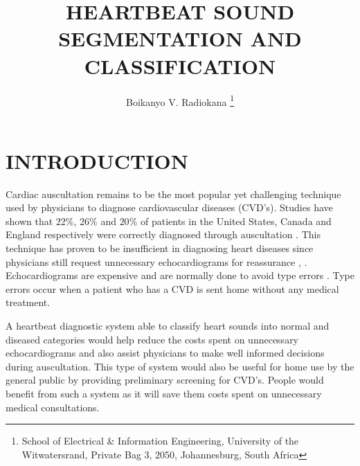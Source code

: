 \documentclass[10pt,twocolumn]{witseiepaper}
\newcommand{\RomanNumeralCaps}[1]
    {\MakeUppercase{\romannumeral #1}}
\begin{document}
\title{\centering HEARTBEAT SOUND SEGMENTATION AND CLASSIFICATION}

\author{Boikanyo V. Radiokana
\thanks{School of Electrical \& Information Engineering, University of the
Witwatersrand, Private Bag 3, 2050, Johannesburg, South Africa}
}


%



\maketitle
\thispagestyle{empty}\pagestyle{empty}


%
\section{INTRODUCTION}
Cardiac auscultation remains to be the most popular yet challenging technique used by physicians to diagnose cardiovascular diseases (CVD's). Studies have shown that $22\%$, $26\%$ and $20\%$ of patients in the United States, Canada and England respectively were correctly diagnosed through auscultation \cite{1}. This technique has proven to be insufficient in diagnosing heart diseases since physicians still request unnecessary echocardiograms for reassurance \cite{strunic2007detection}, \cite{meziani2012analysis}. Echocardiograms are expensive and are normally done to avoid type \RomanNumeralCaps{2} errors \cite{strunic2007detection}. Type \RomanNumeralCaps{2} errors occur when a patient who has a CVD is sent home without any medical treatment. 

A heartbeat diagnostic system able to classify heart sounds into normal and diseased categories would help reduce the costs spent on unnecessary echocardiograms and also assist physicians to make well informed decisions during auscultation. This type of system would also be useful for home use by the general public by providing preliminary screening for CVD's. People would benefit from such a system as it will save them costs spent on unnecessary medical consultations.
\end{document}
